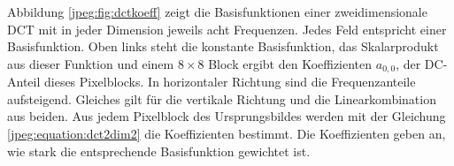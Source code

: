 Abbildung \ref{jpeg:fig:dctkoeff} zeigt die Basisfunktionen einer zweidimensionale DCT mit in jeder Dimen\-sion jeweils acht Frequenzen.
Jedes Feld entspricht einer Basisfunktion.
Oben links steht die konstante Basisfunktion, das Skalarprodukt aus dieser Funktion und einem \(8 \times 8\) Block ergibt den Koeffizienten \(a_{0,0}\), der DC-Anteil dieses Pixelblocks.
In horizontaler Richtung sind die Frequenzanteile aufsteigend.
Gleiches gilt für die vertikale Richtung und die Linearkombination aus beiden.
Aus jedem Pixelblock des Ursprungsbildes werden mit der Gleichung \eqref{jpeg:equation:dct2dim2} die Koeffizienten bestimmt.
Die Koeffizienten geben an, wie stark die entsprechende Basisfunktion gewichtet ist. 



